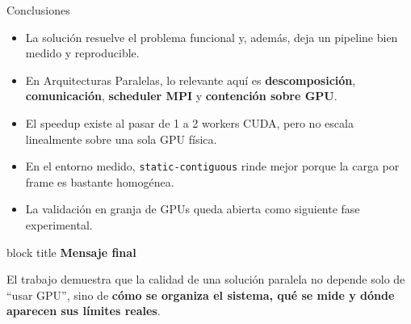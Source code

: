 \documentclass[aspectratio=169,11pt]{beamer}
\begin{document}
\begin{frame}{Conclusiones}
  \small
  \begin{itemize}
    \item La solución resuelve el problema funcional y, además, deja un pipeline bien medido y reproducible.
    \item En Arquitecturas Paralelas, lo relevante aquí es \textbf{descomposición}, \textbf{comunicación}, \textbf{scheduler MPI} y \textbf{contención sobre GPU}.
    \item El speedup existe al pasar de 1 a 2 workers CUDA, pero no escala linealmente sobre una sola GPU física.
    \item En el entorno medido, \texttt{static-contiguous} rinde mejor porque la carga por frame es bastante homogénea.
    \item La validación en granja de GPUs queda abierta como siguiente fase experimental.
  \end{itemize}

  \vspace{0.35em}
  \begin{beamercolorbox}[wd=\linewidth,sep=0.7em,rounded=true,shadow=false]{block title}
    {\bfseries Mensaje final}\par
    \vspace{0.15em}
    El trabajo demuestra que la calidad de una solución paralela no depende solo de ``usar GPU'', sino de \textbf{cómo se organiza el sistema, qué se mide y dónde aparecen sus límites reales}.
  \end{beamercolorbox}
\end{frame}
\end{document}
